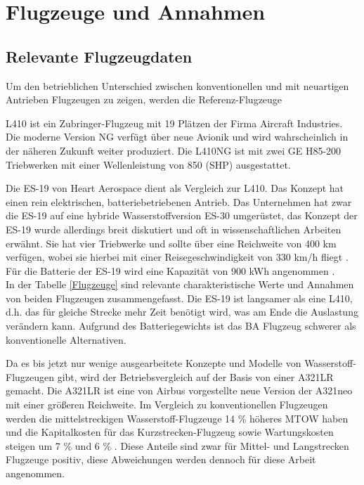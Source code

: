 \section{Flugzeuge und Annahmen}
\subsection{Relevante Flugzeugdaten}
Um den betrieblichen Unterschied zwischen konventionellen und mit neuartigen Antrieben Flugzeugen zu zeigen, werden die Referenz-Flugzeuge %

L410 ist ein Zubringer-Flugzeug mit 19 Plätzen der Firma Aircraft Industries. Die moderne Version NG verfügt über neue Avionik und wird
wahrscheinlich in der näheren Zukunft weiter produziert.
Die L410NG ist mit zwei GE H85-200 Triebwerken mit einer Wellenleistung von 850 (SHP) ausgestattet.


Die ES-19 von Heart Aerospace dient als Vergleich zur L410. Das Konzept hat einen rein elektrischen, batteriebetriebenen Antrieb.
Das Unternehmen hat zwar die ES-19 auf eine hybride Wasserstoffversion ES-30 umgerüstet, das Konzept der ES-19 wurde allerdings breit diskutiert 
und oft in wissenschaftlichen Arbeiten erwähnt. Sie hat vier Triebwerke und sollte über eine Reichweite von 400 km verfügen, 
wobei sie hierbei mit einer Reisegeschwindigkeit von 330 km/h fliegt \cite{anker2023feasibility} \cite{heart_aerospace_es19}.
Für die Batterie der ES-19 wird eine Kapazität von 900 kWh angenommen \cite{donckers2024electric}. \\
In der Tabelle \ref{Flugzeuge} sind relevante charakteristische Werte und Annahmen von beiden Flugzeugen zusammengefasst.
Die ES-19 ist langsamer als eine L410, d.h. das für gleiche Strecke mehr Zeit benötigt wird, was am Ende die Auslastung verändern kann.
Aufgrund des Batteriegewichts ist das BA Flugzeug schwerer als konventionelle Alternativen.

Da es bis jetzt nur wenige ausgearbeitete Konzepte und Modelle von Wasserstoff-Flugzeugen gibt, wird der Betriebsvergleich
auf der Basis von einer A321LR gemacht.
Die A321LR ist eine von Airbus vorgestellte neue Version der A321neo mit einer größeren Reichweite.
Im Vergleich zu konventionellen Flugzeugen werden die mittelstreckigen Wasserstoff-Flugzeuge 14 \% höheres MTOW haben 
und die Kapitalkosten für das Kurzstrecken-Flugzeug sowie Wartungskosten steigen um 7 \% und 6 \% \cite{sky2020hydrogen}. 
Diese Anteile sind zwar für Mittel- und Langstrecken Flugzeuge positiv, diese Abweichungen werden dennoch für diese Arbeit angenommen.


